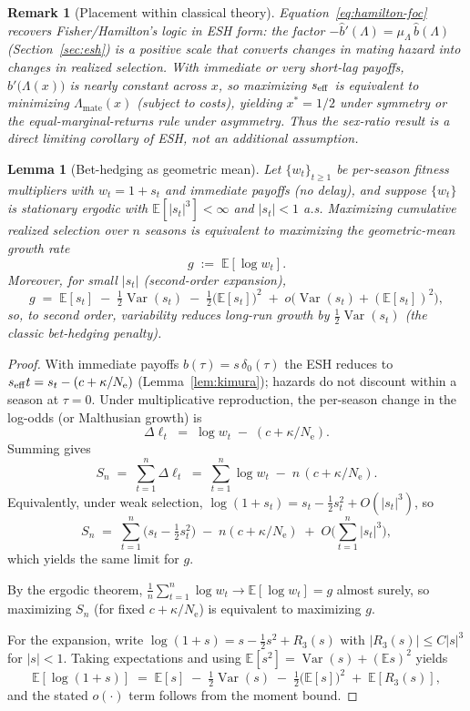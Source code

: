 \documentclass[11pt]{article}
\theoremstyle{upright}
\newtheorem{lemma}{Lemma}
\newtheorem{remark}{Remark}
\newcommand{\Var}{\operatorname{Var}}
\newcommand{\Ne}{N_{\mathrm{e}}}
\newcommand{\seff}[1][]{s_{\mathrm{eff}\if\relax\detokenize{#1}\relax\else,#1\fi}}
\begin{document}
\begin{remark}[Placement within classical theory]
Equation~\eqref{eq:hamilton-foc} recovers Fisher/Hamilton’s logic in ESH form:
the factor $-\widehat b'(\Lambda)=\mu_\Lambda\,\widehat b(\Lambda)$ (Section~\ref{sec:esh}) is a positive scale
that converts changes in mating hazard into changes in realized selection.
With immediate or very short-lag payoffs, $\widehat b'\!\big(\Lambda(x)\big)$ is nearly constant across $x$,
so maximizing $\seff$ is equivalent to minimizing $\Lambda_{\mathrm{mate}}(x)$ (subject to costs),
yielding $x^{\ast}=1/2$ under symmetry or the equal-marginal-returns rule under asymmetry.
Thus the sex-ratio result is a direct limiting corollary of ESH, not an additional assumption.
\end{remark}


\begin{lemma}[Bet-hedging as geometric mean]\label{lem:bet}
Let $\{w_t\}_{t\ge 1}$ be per-season fitness multipliers with $w_t=1+s_t$ and immediate payoffs (no delay), and suppose $\{w_t\}$ is stationary ergodic with $\mathbb E[|s_t|^3]<\infty$ and $|s_t|<1$ a.s.
Maximizing cumulative realized selection over $n$ seasons is equivalent to maximizing the geometric-mean growth rate
\[
g \;:=\; \mathbb E[\log w_t].
\]
Moreover, for small $|s_t|$ (second-order expansion),
\[
g \;=\; \mathbb E[s_t] \;-\; \tfrac12 \Var(s_t) \;-\; \tfrac12 \big(\mathbb E[s_t]\big)^2 \;+\; o\!\big(\Var(s_t)+(\mathbb E[s_t])^2\big),
\]
so, to second order, variability reduces long-run growth by $\tfrac12\Var(s_t)$ (the classic bet-hedging penalty).
\end{lemma}

\begin{proof}
With immediate payoffs $b(\tau)=s\,\delta_0(\tau)$ the ESH reduces to $\seff{t}=s_t-(c+\kappa/\Ne)$ (Lemma~\ref{lem:kimura}); hazards do not discount within a season at $\tau=0$. Under multiplicative reproduction, the per-season change in the log-odds (or Malthusian growth) is
\[
\Delta \ell_t \;=\; \log w_t \;-\; (c+\kappa/\Ne).
\]
Summing gives
\[
S_n \;=\; \sum_{t=1}^n \Delta \ell_t \;=\; \sum_{t=1}^n \log w_t \;-\; n\,(c+\kappa/\Ne).
\]
Equivalently, under weak selection, $\log(1+s_t)= s_t - \tfrac12 s_t^2 + O(|s_t|^3)$, so
\[
S_n \;=\; \sum_{t=1}^n \!\Big(s_t - \tfrac12 s_t^2\Big) \;-\; n(c+\kappa/\Ne) \;+\; O\!\Big(\sum_{t=1}^n |s_t|^3\Big),
\]
which yields the same limit for $g$.

By the ergodic theorem, $\frac1n\sum_{t=1}^n \log w_t \to \mathbb E[\log w_t]=g$ almost surely, so maximizing $S_n$ (for fixed $c+\kappa/\Ne$) is equivalent to maximizing $g$.

For the expansion, write $\log(1+s)= s - \tfrac12 s^2 + R_3(s)$ with $|R_3(s)|\le C|s|^3$ for $|s|<1$.
Taking expectations and using $\mathbb E[s^2]=\Var(s)+(\mathbb E s)^2$ yields
\[
\mathbb E[\log(1+s)] \;=\; \mathbb E[s] \;-\; \tfrac12 \Var(s) \;-\; \tfrac12\big(\mathbb E[s]\big)^2 \;+\; \mathbb E[R_3(s)],
\]
and the stated $o(\cdot)$ term follows from the moment bound.
\end{proof}
\end{document}
